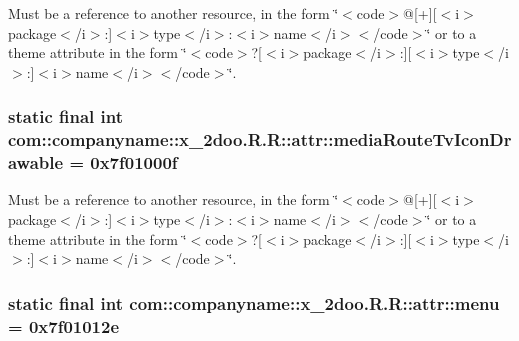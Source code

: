 Must be a reference to another resource, in the form \char`\"{}$<$code$>$@\mbox{[}+\mbox{]}\mbox{[}$<$i$>$package$<$/i$>$:\mbox{]}$<$i$>$type$<$/i$>$:$<$i$>$name$<$/i$>$$<$/code$>$\char`\"{} or to a theme attribute in the form \char`\"{}$<$code$>$?\mbox{[}$<$i$>$package$<$/i$>$:\mbox{]}\mbox{[}$<$i$>$type$<$/i$>$:\mbox{]}$<$i$>$name$<$/i$>$$<$/code$>$\char`\"{}. \hypertarget{classcom_1_1companyname_1_1x__2doo_1_1_r_1_1attr_c788a731b2412dec706db82b638e8eba}{
\subsubsection[{mediaRouteTvIconDrawable}]{\setlength{\rightskip}{0pt plus 5cm}static final int com::companyname::x\_\-2doo.R.R::attr::mediaRouteTvIconDrawable = 0x7f01000f}}
\label{classcom_1_1companyname_1_1x__2doo_1_1_r_1_1attr_c788a731b2412dec706db82b638e8eba}


Must be a reference to another resource, in the form \char`\"{}$<$code$>$@\mbox{[}+\mbox{]}\mbox{[}$<$i$>$package$<$/i$>$:\mbox{]}$<$i$>$type$<$/i$>$:$<$i$>$name$<$/i$>$$<$/code$>$\char`\"{} or to a theme attribute in the form \char`\"{}$<$code$>$?\mbox{[}$<$i$>$package$<$/i$>$:\mbox{]}\mbox{[}$<$i$>$type$<$/i$>$:\mbox{]}$<$i$>$name$<$/i$>$$<$/code$>$\char`\"{}. \hypertarget{classcom_1_1companyname_1_1x__2doo_1_1_r_1_1attr_fa221ba686f006e0a8bec2d75d7bcbe7}{
\subsubsection[{menu}]{\setlength{\rightskip}{0pt plus 5cm}static final int com::companyname::x\_\-2doo.R.R::attr::menu = 0x7f01012e}}
\label{classcom_1_1companyname_1_1x__2doo_1_1_r_1_1attr_fa221ba686f006e0a8bec2d75d7bcbe7}


